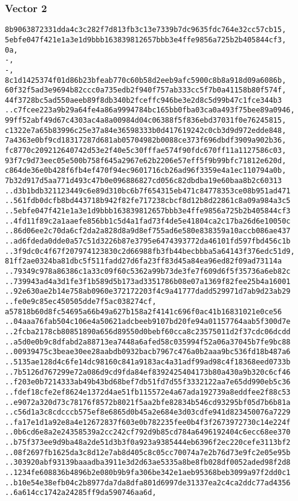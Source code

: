 \documentclass[
]{article}
\begin{document}
\subsubsection{Vector 2}\label{vector-2-2}

\begin{verbatim}
8b9063872331dda4c3c282f7d813fb3c13e7339b7dc9635fdc764e32cc57cb15,
5ebfe047f421e1a3e1d9bbb163839812657bbb3e4ffe9856a725b2b405844cf3,
0a,
-,
-,
8c1d1425374f01d86b23bfeab770c60b58d2eeb9afc5900c8b8a918d09a6086b,
60f32f5ad3e9694b82ccc0a735edb2f940f757ab333cc5f7b0a41158b80f574f,
44f3728bc5ad550aeeb89f8db340b2fceffc946be3e2d8c5d99b47c1fce344b3
..c7fcee223a9b29a64fe4a86a9994784bc165bb0fba03ca0a493f75bee89a0946,
99ff52abf49d67c4303ac4a8a00984d04c06388f5f836ebd37031f0e76245815,
c1322e7a65b83996c25e37a84e36598333b0d417619242c0cb3d9d972edde848,
7a4363e0bf9cd18317287d681ab05704982b0088ce373f696dbdf3909a902b36,
fc8770c209212640742d53e2f40e5c30fffae574f90fdc670ff11a1127586c03,
93f7c9d73eec05e500b758f645a2967e62b2206e57eff5f9b99bfc71812e620d,
c864de36e0b428f6fb4ef470f94ec9601716cb26ad96f3359e4a1ec110794a0b,
7b32d917d5aa771d493c47b0e096886827cd056c82dbdba19e60baa8b2c60313
..d3b1bdb321123449c6e89d310bc6b7f654315eb471c84778353ce08b951ad471
..561fdb0dcfb8bd443718b942f82fe717238cbcf8d12b8d22861c8a09a984a3c5
..5ebfe047f421e1a3e1d9bbb163839812657bbb3e4ffe9856a725b2b405844cf3
..4fd11f89c2a1aaefe856bb1c5d4a1fad73f4de5e41804ca2c17ba26d6e10050c
..86d06ee2c70da6cf2da2a828d8a9d8ef755ad6e580e838359a10accb086ae437
..ad6fdeda0dde0a57c51d3226b87e3795e6474393772da46101fd597fbd456c1b
..3f9dc0c4f67f207974123830c2d66988fb3fb44becbbba5a64143f376edc51d9,
81ff2ae0324ba81dbc5f511fadd27d6fa23ff83d45a84ea96ed82f09ad73114a
..79349c978a86386c1a33c09f60c5362a99b73de3fe7f609d6f5f35736a6eb82c
..739943ad4a3d1fe3f1b589d5b173ad3351786b08e07a1369f82fee25b4a16001
..92e630ae2b14e758ab0960e372172203f4c9a41777dadd529971d7ab9d23ab29
..fe0e9c85ec450505dde7f5ac038274cf,
a57818b60d8fc54695a66b49a627b158a2f4141c696f0ac41b16831021e0ce56
..04aaa76fab504c106e4a50621adcbeeb9107bd20fe94a01157764aab5f300d7e
..2fcba2178cb80851890a656d89550d0bebf60cca8c23575011d2f37cdc06dcdd
..a5d0e0b9c8dfabd2a88713ea7448a6afed58c035994f52a06a37045b7fe9bc88
..00939475c3beae30ee28aabdb0932bacb7967c476a0b2aaa9bc536fd18b487a6
..5135ae128d4c6fe14dc98160c841a9183ac4a31adf99ad98c4f18368eed0733b
..7b5126d767299e72a086d9cd9fda84ef8392425404173b80a430a9b320c6cf46
..f203e0b7214333ab49b43bd68bef7db51fd7d55f3332122aa7e65dd990eb5c36
..fdef18cfe2ef8624e1372d4ae51fb115572e4a67ada192739a8eddfee2f88c53
..e9072a320d73c78176f8572b8021f5aa2bfe82834b546cd93295bf05d7b6b81a
..c56d1a3c8cdcccb575ef8e6865d0b45a2e684e3d03cdfe941d823450076a7229
..fa17e1d1a92e8a4e12672837f603e0b782235fee0b4f3f2673972730c14e224f
..0b6cd6e8a2e24358539a2cc242cf792d9b85cd784a6496192404c6ecc68ee370
..b75f373ee9d9ba48a2de51d3b3f0a923a9385444eb6396f2ec220cefe3113bf2
..08f2697fb1625da3c8d12e7ab8d405c8c05cc70074a7e2b76d73e9fc2e05e95b
..303920abf93139baaadba3911e3d2d63ae5335a8be8fb028df0052aded98f2d8
..1234fe608836b4896b2e080b9b9fa306be342e1aeb95368beb3099a97f2dd0c1
..b10e54e38efb04c2b8977da7da8dfa801d6997de31337ea2c4ca2ddc77ad4356
..6a614cc1742a24285ff9da590746aa6d,
\end{verbatim}
\end{document}
